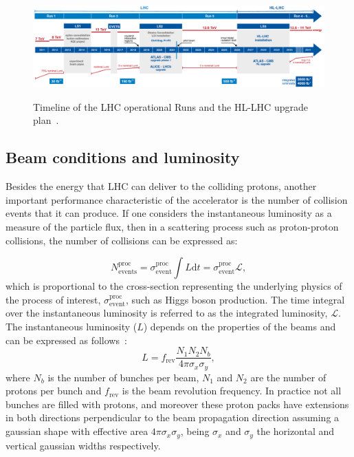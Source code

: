 \begin{figure}[htbp]
    \centering
    \includegraphics[width=1\linewidth]{images/HL-LHC_Plan_January2025.pdf}\\
    \caption{Timeline of the LHC operational Runs and the HL-LHC upgrade plan~\cite{HL-LHC_plans}.}
    \label{fig:LHC-HL}
\end{figure}


\subsection{Beam conditions and luminosity}
\label{subsec:lumi}
Besides the energy that LHC can deliver to the colliding protons, another important performance characteristic of the accelerator is the number of collision events that it can produce. If one considers the instantaneous luminosity as a measure of the particle flux, then in a scattering process such as proton-proton collisions, the number of collisions can be expressed as:

\begin{equation}
  N^{\text{proc}}_\text{{events}} = \sigma^{\text{proc}}_{\text{event}} \int L\text{d}t = \sigma^{\text{proc}}_{\text{event}}\mathcal{L},
\end{equation}
which is proportional to the cross-section representing the underlying physics of the process of interest, $\sigma^{\text{proc}}_{\text{event}}$, such as Higgs boson production. The time integral over the instantaneous luminosity is referred to as the integrated luminosity, $\mathcal{L}$. The instantaneous luminosity ($L$) depends on the properties of the beams and can be expressed as follows~\cite{Aad_2023}:
\begin{equation}
    L = f_{\text{rev}}\frac{N_1 N_2 N_b}{4\pi \sigma_x \sigma_y},
\end{equation}
where $N_b$ is the number of bunches per beam, $N_1$ and $N_2$ are the number of protons per bunch and $f_{\text{rev}}$ is the beam revolution frequency. In practice not all bunches are filled with protons, and moreover these proton packs have extensions in both directions perpendicular to the beam propagation direction assuming a gaussian shape with effective area $4\pi\sigma_{x}\sigma_{y}$, being $\sigma_{x}$ and $\sigma_{y}$ the horizontal and vertical gaussian widths respectively.  

